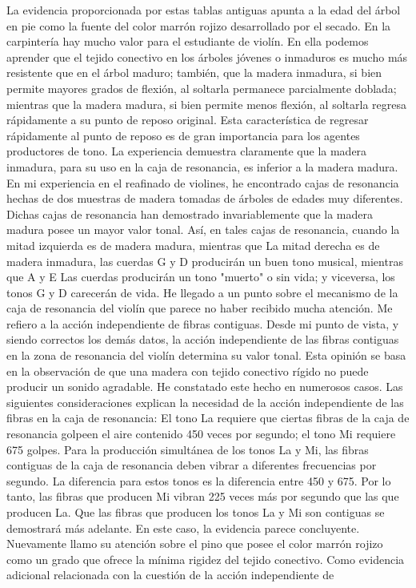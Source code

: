 La evidencia proporcionada por estas tablas antiguas apunta a la edad del árbol en pie como la fuente del color marrón rojizo desarrollado por el secado. En la carpintería hay mucho valor para el estudiante de violín. En ella podemos aprender que el tejido conectivo en los árboles jóvenes o inmaduros es mucho más resistente que en el árbol maduro; también, que la madera inmadura, si bien permite mayores grados de flexión, al soltarla permanece parcialmente doblada; mientras que la madera madura, si bien permite menos flexión, al soltarla regresa rápidamente a su punto de reposo original. Esta característica de regresar rápidamente al punto de reposo es de gran importancia para los agentes productores de tono. La experiencia demuestra claramente que la madera inmadura, para su uso en la caja de resonancia, es inferior a la madera madura. En mi experiencia en el reafinado de violines, he encontrado cajas de resonancia hechas de dos muestras de madera tomadas de árboles de edades muy diferentes. Dichas cajas de resonancia han demostrado invariablemente que la madera madura posee un mayor valor tonal. Así, en tales cajas de resonancia, cuando la mitad izquierda es de madera madura, mientras que
La mitad derecha es de madera inmadura, las cuerdas G y D producirán un buen tono musical, mientras que A y E
Las cuerdas producirán un tono "muerto" o sin vida;
y viceversa, los tonos G y D carecerán de vida.
He llegado a un punto sobre el mecanismo de la caja de resonancia del violín que parece no haber recibido mucha atención.
Me refiero a la acción independiente de fibras contiguas.
Desde mi punto de vista, y siendo correctos los demás datos, la acción independiente de las fibras contiguas en la zona de resonancia del violín determina su valor tonal. Esta opinión se basa en la observación de que una madera con tejido conectivo rígido no puede producir un sonido agradable. He constatado este hecho en numerosos casos. Las siguientes consideraciones explican la necesidad de la acción independiente de las fibras en la caja de resonancia: El tono La requiere que ciertas fibras de la caja de resonancia golpeen el aire contenido 450 veces por segundo; el tono Mi requiere 675 golpes. Para la producción simultánea de los tonos La y Mi, las fibras contiguas de la caja de resonancia deben vibrar a diferentes frecuencias por segundo. La diferencia para estos tonos es la diferencia entre 450 y 675. Por lo tanto, las fibras que producen Mi vibran 225 veces más por segundo que las que producen La. Que las fibras que producen los tonos La y Mi son contiguas se demostrará más adelante. En este caso, la evidencia parece concluyente. Nuevamente llamo su atención sobre el pino que posee el color marrón rojizo como un grado que ofrece la mínima rigidez del tejido conectivo. Como evidencia adicional relacionada con la cuestión de la acción independiente de
